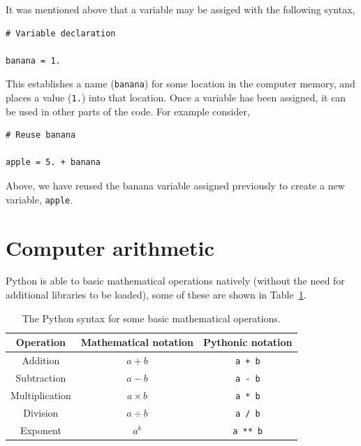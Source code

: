 \documentclass[a4paper]{article}
\begin{document}
It was mentioned above that a variable may be assiged with the following syntax,
\begin{lstlisting}
# Variable declaration

banana = 1.
\end{lstlisting}
This establishes a name (\texttt{banana}) for some location in the computer memory, and places a value (\texttt{1.}) into that location.
Once a variable has been assigned, it can be used in other parts of the code.
For example consider,
\begin{lstlisting}
# Reuse banana

apple = 5. + banana
\end{lstlisting}
Above, we have reused the banana variable assigned previously to create a new variable, \texttt{apple}.
\vspace{\baselineskip}
\begin{center}
	\noindent{}
\end{center}

\section{Computer arithmetic}

Python is able to basic mathematical operations natively (without the need for additional libraries to be loaded), some of these are shown in Table~\ref{tab:ops}.
\begin{table}[h]
	\centering
	\caption{The Python syntax for some basic mathematical operations.}
	\label{tab:ops}
	\begin{tabular}{c c c}
		\hline
		Operation & Mathematical notation & Pythonic notation \\
		\hline
		Addition & $a + b$ & \texttt{a + b} \\
		Subtraction & $a - b$ & \texttt{a - b} \\
		Multiplication & $a \times b$ & \texttt{a * b} \\
		Division & $a \div b$ & \texttt{a / b} \\
		Exponent & $a^b$ & \texttt{a ** b} \\
		\hline
	\end{tabular}
\end{table}
\end{document}
